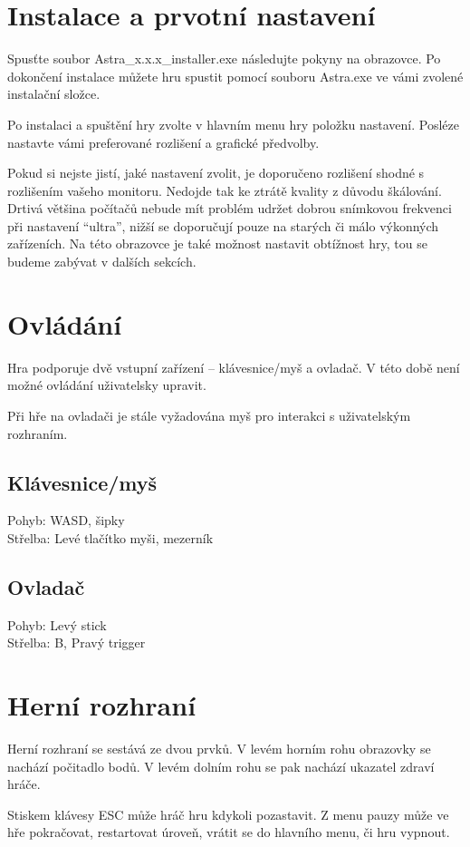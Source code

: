 \documentclass[12pt,a4paper,hidelinks]{article}
\begin{document}
\section{Instalace a prvotní nastavení}
Spusťte soubor Astra{\_}x.x.x{\_}installer.exe následujte pokyny na obrazovce. Po dokončení instalace můžete hru spustit pomocí souboru Astra.exe ve vámi zvolené instalační složce.

Po instalaci a spuštění hry zvolte v hlavním menu hry položku nastavení. Posléze nastavte vámi preferované rozlišení a grafické předvolby.

Pokud si nejste jistí, jaké nastavení zvolit, je doporučeno rozlišení shodné s rozlišením vašeho monitoru. Nedojde tak ke ztrátě kvality z důvodu škálování. Drtivá většina počítačů nebude mít problém udržet dobrou snímkovou frekvenci při nastavení \enquote{ultra}, nižší se doporučují pouze na starých či málo výkonných zařízeních.
Na této obrazovce je také možnost nastavit obtížnost hry, tou se budeme zabývat v dalších sekcích.
\section{Ovládání}
Hra podporuje dvě vstupní zařízení – klávesnice/myš a ovladač. V této době není možné ovládání uživatelsky upravit.

Při hře na ovladači je stále vyžadována myš pro interakci s uživatelským rozhraním.
\subsection{Klávesnice/myš}
Pohyb: WASD, šipky\\
Střelba: Levé tlačítko myši, mezerník

\subsection{Ovladač}
Pohyb: Levý stick\\
Střelba: B, Pravý trigger

\section{Herní rozhraní}
Herní rozhraní se sestává ze dvou prvků. V levém horním rohu obrazovky se nachází počitadlo bodů. V levém dolním rohu se pak nachází ukazatel zdraví hráče.

Stiskem klávesy ESC může hráč hru kdykoli pozastavit. Z menu pauzy může ve hře pokračovat, restartovat úroveň, vrátit se do hlavního menu, či hru vypnout.
\end{document}
